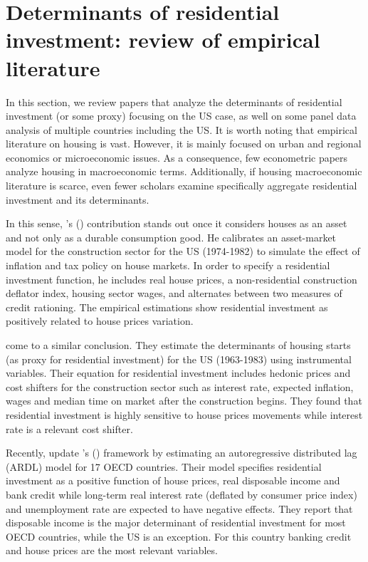 \documentclass[12pt, a4paper]{article}
\begin{document}
\section{Determinants of residential investment: review of empirical literature}
\label{sec:orgc66f5a0}
\label{sec:empirical_review}
In this section, we review papers that analyze the determinants of residential investment (or some proxy) focusing on the US case, as well on some panel data analysis of multiple countries including the US.
It is worth noting that empirical literature on housing is vast.
However, it is mainly focused on urban and regional economics or microeconomic issues.
As a consequence, few econometric papers analyze housing in macroeconomic terms.
Additionally, if housing macroeconomic literature is scarce, even fewer scholars examine specifically aggregate residential investment and its determinants.

In this sense, \citeauthor*{poterba_tax_1984}'s (\citeyear{poterba_tax_1984}) contribution stands out once it considers houses as an asset and not only as a durable consumption good.
He calibrates an asset-market model for the construction sector for the US (1974-1982) to simulate the effect of inflation and tax policy on house markets.
In order to specify a residential investment function, he includes real house prices, a non-residential construction deflator index, housing sector wages, and alternates between two measures  of  credit  rationing.
The empirical estimations show residential investment as positively related to house prices variation.

\textcite{topel_1988_Housing} come to a similar conclusion.
They estimate the determinants of housing starts (as  proxy for residential investment) for the US (1963-1983) using instrumental variables.
Their equation for residential investment includes hedonic prices and cost shifters for the construction sector such as interest rate, expected inflation, wages and median time on market after the construction begins.
They found that residential investment is highly sensitive to house prices movements while interest rate is a relevant cost shifter.

Recently,  \textcite{arestis_residential_2015} update \citeauthor*{poterba_tax_1984}'s (\citeyear{poterba_tax_1984}) framework by estimating an autoregressive distributed lag (ARDL) model for 17 OECD countries.
Their model specifies residential investment as a positive function of house prices, real disposable income and bank credit while long-term real interest rate (deflated by consumer price index) and unemployment rate are expected to have negative effects.
They report that disposable income is the major determinant of residential investment for most OECD countries, while the US is an exception.
For this country banking credit and house prices are the most relevant variables.
\end{document}
